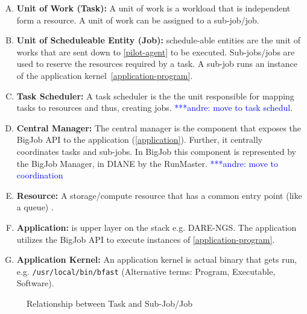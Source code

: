 \documentclass[]{article}
\newcommand{\alnote}[1]{ {\textcolor{blue} { ***andre: #1 }}}
\newcommand{\alnote}[1]{}
\begin{document}
\begin{enumerate}[A.]
	\item \textbf{Unit of Work (Task):} A unit of work is a workload that is 
	independent form a resource. A unit of work can be assigned to a 
	sub-job/job.
	\item \textbf{Unit of Scheduleable Entity (Job):} schedule-able entities are 
	the unit of works that are sent down to \ref{pilot-agent} to be executed. 
	Sub-jobs/jobs are used to reserve the resources required by a task. A 
	sub-job runs an instance of the application 
	kernel~\ref{application-program}. 	
	\item \textbf{Task Scheduler:} A task scheduler is the the unit responsible
	for mapping tasks to resources and thus, creating jobs. \alnote{move to task schedul.}
	\item \textbf{Central Manager:} The central manager is the component that 
	exposes the BigJob API to the application (\ref{application}). Further, it 
	centrally coordinates tasks and sub-jobs. In BigJob this component is 
	represented by the BigJob Manager, in DIANE by the RunMaster.
    \alnote{move to coordination}
	\item \textbf{Resource:} A storage/compute resource that has a common entry 
	point (like a queue) \label{resource}.
	\item \textbf{Application:} is upper layer on the stack e.g. DARE-NGS. The application utilizes the BigJob API to execute instances of \ref{application-program}. \label{application}
	\item \textbf{Application Kernel:} An application kernel is actual binary that gets run, e.g. \texttt{/usr/local/bin/bfast} (Alternative terms: Program, Executable, Software). \label{application-program}	
	
\end{enumerate}

\begin{figure}[htbp]
        \centering
    \qquad\qquad
    \caption{Relationship between Task and Sub-Job/Job}
    \label{fig:figures_task-job1}
\end{figure}    
\end{document}
